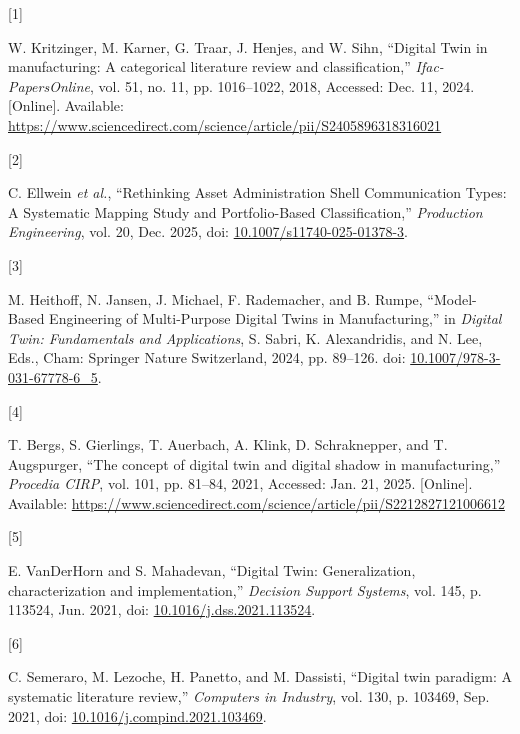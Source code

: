 \documentclass[
  12pt,
  a4paper,
]{article}
\newlength{\cslhangindent}
\newlength{\csllabelwidth}
\newenvironment{CSLReferences}[2] %
 {\begin{list}{}{%
  \setlength{\itemindent}{0pt}
  \setlength{\leftmargin}{0pt}
  \setlength{\parsep}{0pt}
  \ifodd #1
   \setlength{\leftmargin}{\cslhangindent}
   \setlength{\itemindent}{-1\cslhangindent}
  \fi
  \setlength{\itemsep}{#2\baselineskip}}}
 {\end{list}}
\newcommand{\CSLLeftMargin}[1]{\parbox[t]{\csllabelwidth}{\strut#1\strut}}
\newcommand{\CSLRightInline}[1]{\parbox[t]{\linewidth - \csllabelwidth}{\strut#1\strut}}
\begin{document}
\protect{}\label{refs}
\begin{CSLReferences}{0}{0}
\CSLLeftMargin{{[}1{]} }%
\CSLRightInline{W. Kritzinger, M. Karner, G. Traar, J. Henjes, and W.
Sihn, {``Digital {Twin} in manufacturing: {A} categorical literature
review and classification,''} \emph{Ifac-PapersOnline}, vol. 51, no. 11,
pp. 1016--1022, 2018, Accessed: Dec. 11, 2024. {[}Online{]}. Available:
\url{https://www.sciencedirect.com/science/article/pii/S2405896318316021}}

\CSLLeftMargin{{[}2{]} }%
\CSLRightInline{C. Ellwein \emph{et al.}, {``Rethinking {Asset}
{Administration} {Shell} {Communication} {Types}: {A} {Systematic}
{Mapping} {Study} and {Portfolio}-{Based} {Classification},''}
\emph{Production Engineering}, vol. 20, Dec. 2025, doi:
\href{https://doi.org/10.1007/s11740-025-01378-3}{10.1007/s11740-025-01378-3}.}

\CSLLeftMargin{{[}3{]} }%
\CSLRightInline{M. Heithoff, N. Jansen, J. Michael, F. Rademacher, and
B. Rumpe, {``Model-{Based} {Engineering} of {Multi}-{Purpose} {Digital}
{Twins} in {Manufacturing},''} in \emph{Digital {Twin}: {Fundamentals}
and {Applications}}, S. Sabri, K. Alexandridis, and N. Lee, Eds., Cham:
Springer Nature Switzerland, 2024, pp. 89--126. doi:
\href{https://doi.org/10.1007/978-3-031-67778-6_5}{10.1007/978-3-031-67778-6\_5}.}

\CSLLeftMargin{{[}4{]} }%
\CSLRightInline{T. Bergs, S. Gierlings, T. Auerbach, A. Klink, D.
Schraknepper, and T. Augspurger, {``The concept of digital twin and
digital shadow in manufacturing,''} \emph{Procedia CIRP}, vol. 101, pp.
81--84, 2021, Accessed: Jan. 21, 2025. {[}Online{]}. Available:
\url{https://www.sciencedirect.com/science/article/pii/S2212827121006612}}

\CSLLeftMargin{{[}5{]} }%
\CSLRightInline{E. VanDerHorn and S. Mahadevan, {``Digital {Twin}:
{Generalization}, characterization and implementation,''} \emph{Decision
Support Systems}, vol. 145, p. 113524, Jun. 2021, doi:
\href{https://doi.org/10.1016/j.dss.2021.113524}{10.1016/j.dss.2021.113524}.}

\CSLLeftMargin{{[}6{]} }%
\CSLRightInline{C. Semeraro, M. Lezoche, H. Panetto, and M. Dassisti,
{``Digital twin paradigm: {A} systematic literature review,''}
\emph{Computers in Industry}, vol. 130, p. 103469, Sep. 2021, doi:
\href{https://doi.org/10.1016/j.compind.2021.103469}{10.1016/j.compind.2021.103469}.}


\end{CSLReferences}
\end{document}
